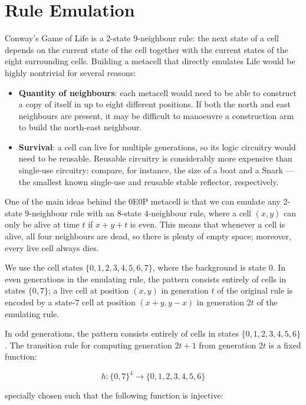 \section{Rule Emulation}

Conway's Game of Life is a 2-state 9-neighbour rule: the next state of a cell
depends on the current state of the cell together with the current states of
the eight surrounding cells. Building a metacell that directly emulates Life
would be highly nontrivial for several reasons:

\begin{itemize}
\item \textbf{Quantity of neighbours}: each metacell would need to be able to
construct a copy of itself in up to eight different positions. If both the
north and east neighbours are present, it may be difficult to manoeuvre a
construction arm to build the north-east neighbour.
\item \textbf{Survival}: a cell can live for multiple generations, so its
logic circuitry would need to be reusable. Reusable circuitry is considerably
more expensive than single-use circuitry: compare, for instance, the size of
a boat and a Snark --- the smallest known single-use and reusable stable
reflector, respectively.
\end{itemize}

One of the main ideas behind the 0E0P metacell is that we can emulate any
2-state 9-neighbour rule with an 8-state 4-neighbour rule, where a cell
$(x, y)$ can only be alive at time $t$ if $x + y + t$ is even. This means
that whenever a cell is alive, all four neighbours are dead, so there is
plenty of empty space; moreover, every live cell always dies.

We use the cell states $\{ 0, 1, 2, 3, 4, 5, 6, 7 \}$, where the background
is state 0. In even generations in the emulating rule, the pattern consists
entirely of cells in states $\{ 0, 7 \}$; a live cell at position $(x, y)$
in generation $t$ of the original rule is encoded by a state-$7$ cell at
position $(x + y, y - x)$ in generation $2t$ of the emulating rule.

In odd generations, the pattern consists entirely of cells in states
$\{ 0, 1, 2, 3, 4, 5, 6 \}$. The transition rule for computing generation
$2t + 1$ from generation $2t$ is a fixed function:

$$ h : \{ 0, 7 \}^4 \rightarrow \{ 0, 1, 2, 3, 4, 5, 6 \} $$

specially chosen such that the following function is injective:

